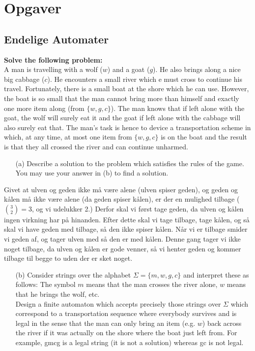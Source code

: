 \chapter{Opgaver}

\section{Endelige Automater}

\noindent
\textbf{Solve the following problem:} \\
\noindent
A man is travelling with a wolf ($w$) and a goat ($g$). He also brings along a nice big cabbage ($c$). He encounters a small river which e must cross to continue his travel. Fortunately, there is a small boat at the shore which he can use. However, the boat is so small that the man cannot bring more than himself and exactly one more item along (from $\{w, g, c\}$). The man knows that if left alone with the goat, the wolf will surely eat it and the goat if left alone with the cabbage will also surely eat that. The man's task is hence to device a transportation scheme in which, at any time, at most one item from $\{w,g,c\}$ is on the boat and the result is that they all crossed the river and can continue unharmed.

\begin{enumerate}
  \item[(a)] Describe a solution to the problem which satisfies the rules of the game. You may use your answer in (b) to find a solution.
\end{enumerate}

Givet at ulven og geden ikke må være alene (ulven spiser geden), og geden og kålen må ikke være alene (da geden spiser kålen), er der en mulighed tilbage ($\binom{3}{2} = 3$, og vi udelukker 2.) Derfor skal vi først tage geden, da ulven og kålen ingen virkning har på hinanden. Efter dette skal vi tage tilbage, tage kålen, og så skal vi have geden med tilbage, så den ikke spiser kålen. Når vi er tilbage smider vi geden af, og tager ulven med så den er med kålen. Denne gang tager vi ikke noget tilbage, da ulven og kålen er gode venner, så vi henter geden og kommer tilbage til begge to uden der er sket noget.

\begin{enumerate}
\item [(b)] Consider strings over the alphabet $\Sigma = \{m, w, g, c\}$ and interpret these as follows: The symbol $m$ means that the man crosses the river alone, $w$ means that he brings the wolf, etc. \\ Design a finite automaton which accepts precisely those strings over $\Sigma$ which correspond to a transportation sequence where everybody survives and is legal in the sense that the man can only bring an item (e.g. $w$) back across the river if it was actually on the shore where the boat just left from. For example, gmcg is a legal string (it is not a solution) whereas gc is not legal.
\end{enumerate}

